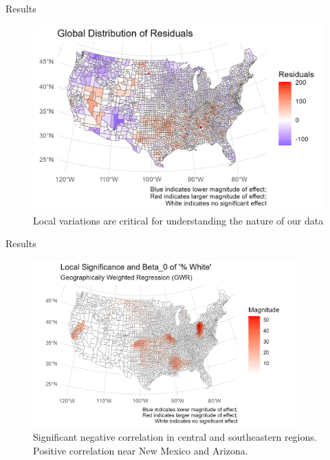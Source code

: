 \documentclass[
  ignorenonframetext,
]{beamer}
\begin{document}
\begin{frame}{Results}
\label{results-1}
\begin{figure}[H]

{\centering \includegraphics{PresentationPhotos/gdrplot.png}

}

\caption{Local variations are critical for understanding the nature of
our data}

\end{figure}%
\end{frame}

\begin{frame}{Results}
\label{results-2}
\begin{figure}[H]

{\centering \includegraphics[width=0.9\textwidth,height=\textheight]{PresentationPhotos/whiteplot.png}

}

\caption{Significant negative correlation in central and southeastern
regions. Positive correlation near New Mexico and Arizona.}

\end{figure}%
\end{frame}
\end{document}
